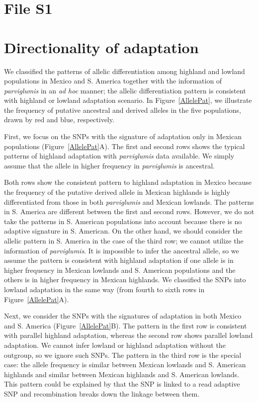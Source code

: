 \newpage
\suppl
\section*{File S1}

\section*{Directionality of adaptation} \label{sec:supptextsho}

We classified the patterns of allelic differentiation among highland and lowland populations in Mexico and S. America together with the information of \emph{parviglumis} in an \emph{ad hoc} manner; the allelic differentiation pattern is consistent with highland or lowland adaptation scenario.  
In Figure~\ref{AllelePat}, we illustrate the frequency of putative ancestral and derived alleles in the five populations, drawn by red and blue, respectively.

First, we focus on the SNPs with the signature of adaptation only in Mexican populations (Figure~\ref{AllelePat}A).  
The first and second rows shows the typical patterns of highland adaptation with \emph{parviglumis} data available.
We simply assume that the allele in higher frequency in \emph{parviglumis} is ancestral.

Both rows show the consistent pattern to highland adaptation in Mexico because the frequency of the putative derived allele in Mexican highlands is highly differentiated from those in both \emph{parviglumis} and Mexican lowlands.
The patterns in S. America are different between the first and second rows.
However, we do not take the patterns in S. American populations into account because there is no adaptive signature in S. American.
On the other hand, we should consider the allelic pattern in S. America in the case of the third row; we cannot utilize the information of \emph{parviglumis}.
It is impossible to infer the ancestral allele, so we assume the pattern is consistent with highland adaptation if one allele is in higher frequency in Mexican lowlands and S. American populations and the others is in higher frequency in Mexican highlands.
We classified the SNPs into lowland adaptation in the same way (from fourth to sixth rows in Figure~\ref{AllelePat}A).

Next, we consider the SNPs with the signatures of adaptation in both Mexico and S. America (Figure~\ref{AllelePat}B).
The pattern in the first row is consistent with parallel highland adaptation, whereas the second row shows parallel lowland adaptation. 
We cannot infer lowland or highland adaptation without the outgroup, so we ignore such SNPs.
The pattern in the third row is the special case: the allele frequency is similar between Mexican lowlands and S. American highlands and similar between Mexican highlands and S. American lowlands.
This pattern could be explained by that the SNP is linked to a read adaptive SNP and recombination breaks down the linkage between them.

